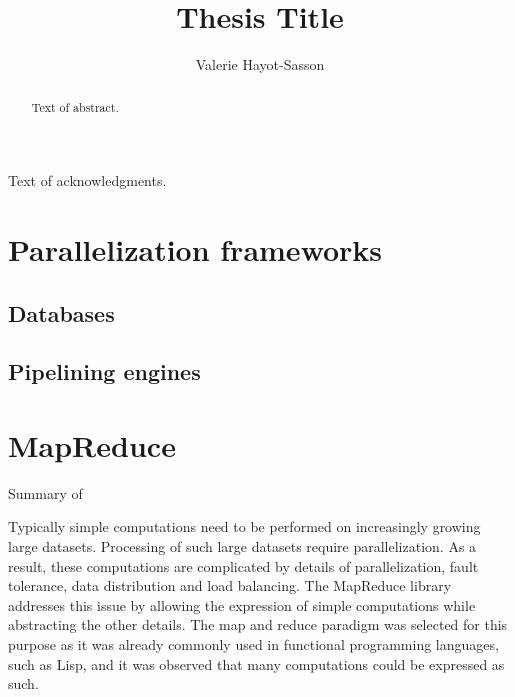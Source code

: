 \documentclass{report}
\author{Valerie Hayot-Sasson}
\title{Thesis Title}
\begin{document}
\begin{abstract}
  Text of abstract.  
\end{abstract}

\begin{acknowledgments}
  Text of acknowledgments.
\end{acknowledgments}

\chapter{Parallelization frameworks}
\section{Databases}
\section{Pipelining engines}
\chapter{MapReduce}
Summary of ~\cite{mapred}

Typically simple computations need to be performed on increasingly growing large datasets. Processing of such large datasets require
parallelization. As a result, these computations are complicated by details of parallelization, fault tolerance, data distribution and load
balancing. The MapReduce library addresses this issue by allowing the expression of simple computations while abstracting the other
details. The map and reduce paradigm was selected for this purpose as it was already commonly used in functional programming languages,
 such as Lisp, and it was observed that many computations could be expressed as such.
\end{document}
